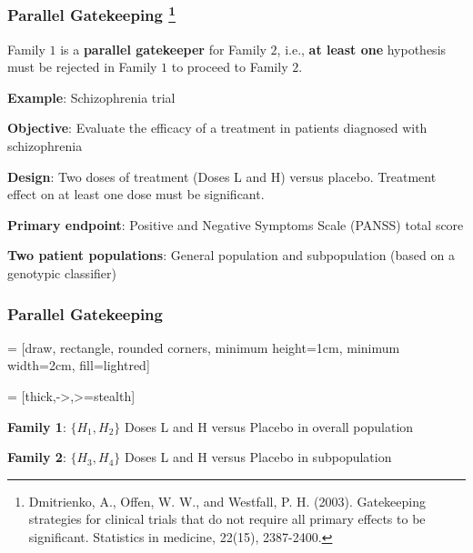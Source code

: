 \documentclass[xcolor={dvipsnames}]{beamer}
\newcommand{\rbf}[1]{\textcolor{redUnipd}{ #1}}
\begin{document}
\begin{frame}
\frametitle{Parallel Gatekeeping \footnote{Dmitrienko, A., Offen, W. W., and Westfall, P. H. (2003). Gatekeeping strategies for clinical trials that do not require all primary effects to be significant. Statistics in medicine, 22(15), 2387-2400.}}

Family $1$ is a \rbf{\textbf{parallel gatekeeper}} for Family $2$, i.e., \textbf{at least one} hypothesis must be rejected in Family $1$ to proceed to Family $2$.

\bigskip

\rbf{\textbf{Example}}: Schizophrenia trial

\textbf{Objective}: Evaluate the efficacy of a treatment in patients diagnosed with schizophrenia

\textbf{Design}: Two doses of treatment (Doses L and H) versus placebo. Treatment effect on at least one dose must be
significant.

\textbf{Primary endpoint}: Positive and Negative Symptoms Scale (PANSS) total score

\textbf{Two patient populations}: General population and subpopulation (based on a genotypic classifier)
\end{frame}


\begin{frame}
\frametitle{Parallel Gatekeeping}
 = [draw, rectangle, rounded corners, minimum height=1cm, minimum width=2cm, fill=lightred]

 = [thick,->,>=stealth]

\begin{figure}
\centering

\end{figure}
\bigskip

\textbf{Family 1}: $\{H_1, H_2\}$ Doses L and H versus Placebo in overall population

\textbf{Family 2}: $\{H_3, H_4\}$ Doses L and H versus Placebo in subpopulation
\end{frame}
\end{document}
